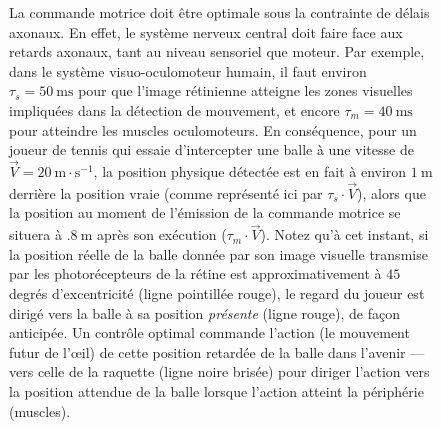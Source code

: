 \documentclass[11pt,french,a4paper,oneside]{article}%
\newcommand{\ms}{\si{\milli\second}}%
\newcommand{\m}{\si{\meter}}%
\newcommand{\s}{\si{\second}}%
\begin{document}
\begin{figure}
{%
La commande motrice doit être optimale sous la contrainte de délais axonaux. En effet, le système nerveux central doit faire face aux retards axonaux, tant au niveau sensoriel que moteur. Par exemple, dans le système visuo-oculomoteur humain, il faut environ $\tau_s = 50 ~\ms $ pour que l'image rétinienne atteigne les zones visuelles impliquées dans la détection de mouvement, et encore $\tau_m = 40 ~\ms $ pour atteindre les muscles oculomoteurs. En conséquence, pour un joueur de tennis qui essaie d'intercepter une balle  à une vitesse de $ \vec {V} = 20 ~\m\cdot\s ^ {- 1} $, la position physique détectée est en fait à environ $ 1 ~\m $ derrière la position vraie (comme représenté ici par $\tau_s\cdot\vec {V} $), alors que la position au moment de l'émission de la commande motrice se situera à $ .8 ~\m $ après son exécution ($\tau_m\cdot\vec {V} $). Notez qu'à cet instant, si la position réelle de la balle donnée par son image visuelle transmise par les photorécepteurs de la rétine  est approximativement à $ 45 $ degrés d'excentricité (ligne pointillée rouge), le regard du joueur est dirigé vers la balle à sa position \emph{présente} (ligne rouge), de façon anticipée. Un contrôle optimal commande l'action (le mouvement futur de l'\oe il) de cette position retardée de la balle dans l'avenir --- vers celle de la raquette (ligne noire brisée) pour diriger l'action vers la position attendue de la balle lorsque l'action atteint la périphérie (muscles).
}%
\label{fig:figure0}
\end{figure}
\end{document}
